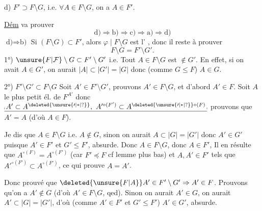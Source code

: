 d) $F'\supset F\setminus G$, i.e. $\forall A\in F\setminus G$, on a $A\in F'$.

\uline{Dém}   va prouver 
\[
 \text{d)}\Longrightarrow\text{b)}\Longrightarrow\text{c)}\Longrightarrow\text{a)}\Longrightarrow\text{d)}
\]
 $\text{d)}\Rightarrow\text{b)}$ Si $(F\setminus G)\subset F'$, alors $\varphi\mid F\setminus G$ est l'  ,  donc il reste à prouver
\[
 F\setminus G=F'\setminus G'.
\]
 1°) $\unsure{F|\mathcal F}\setminus G\subset F'\setminus G'$ i.e. Tout $A\in F\setminus G$ est $\notin G'$. En effet, si on avait $A\in G'$, on aurait $|A|\subset|G'|=|G|$ donc  (comme $G\leq F$) $A\in G$.


2°) $F'\setminus G'\subset F\setminus G$ Soit $A'\in F'\setminus G'$, prouvons $A'\in F\setminus G$, et d'abord $A'\in F$.  Soit $A$ le plus petit él. de $F^{A'}$ donc $\underline{\rule[-.15ex]{.35pt}{.55ex}\,A'\subset A^{\deleted{\unsure{\prime|\ast|?}}},\ A'^{\circ(F')}\subset A^{\deleted{\unsure{\prime|\ast|?}}\circ(F)}\,\rule[-.15ex]{.35pt}{.55ex}}$ prouvons que $A'=A$ (d'où $A\in F$). 

Je dis que $A\in F\setminus G$ i.e. $A\notin G$, sinon on aurait $A\subset|G|=|G'|$ donc $A'\in G'$ puisque $A'\in F'$ et $G'\leq F'$, absurde.  Donc $A\in F\setminus G$, donc $A\in F'$,  Il en résulte que $A^{\circ(F)}=A^{\circ(F')}$ (car $F'\preceq F$\deleted{)} cf lemme plus bas) et   $A,A'\in F'$ tels que $A'^{\circ(F')}\subset A^{\circ(F')}$, ce qui prouve $A=A'$.

Donc  prouvé que $\deleted{\unsure{F|A}}A'\in F'\setminus G'\Rightarrow A'\in F$. Prouvons qu'on a $A'\notin G$ (d'où $A'\in F\setminus G$\deleted{)}, qed). Sinon on aurait $A'\in G$, on aurait $A'\subset |G|=|G'|$, d'où (comme $A'\in F'$ et $G'\leq F'$) $A'\in G'$, absurde.

